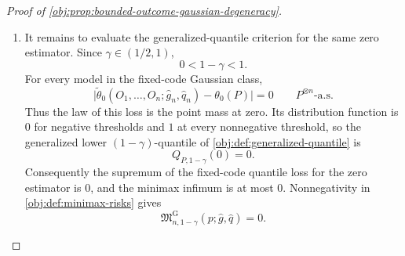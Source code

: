 \begin{proof}[Proof of \cref{obj:prop:bounded-outcome-gaussian-degeneracy}]
\begin{enumerate}
\item It remains to evaluate the generalized-quantile criterion for the same zero estimator. Since \(\gamma\in(1/2,1)\),
\[
0<1-\gamma<1.
\]
For every model in the fixed-code Gaussian class,
\[
\bigl|\widetilde\theta_0(O_1,\ldots,O_n;\widehat g_n,\widehat q_n)-\theta_0(P)\bigr|=0
\qquad P^{\otimes n}\text{-a.s.}
\]
Thus the law of this loss is the point mass at zero. Its distribution function is \(0\) for negative thresholds and \(1\) at every nonnegative threshold, so the generalized lower \((1-\gamma)\)-quantile of \cref{obj:def:generalized-quantile} is
\[
Q_{P,1-\gamma}(0)=0 .
\]
Consequently the supremum of the fixed-code quantile loss for the zero estimator is \(0\), and the minimax infimum is at most \(0\). Nonnegativity in \cref{obj:def:minimax-risks} gives
\[
\mathfrak M_{n,1-\gamma}^{\mathrm G}(p;\widehat g,\widehat q)=0 .
\]
\end{enumerate}
\end{proof}
